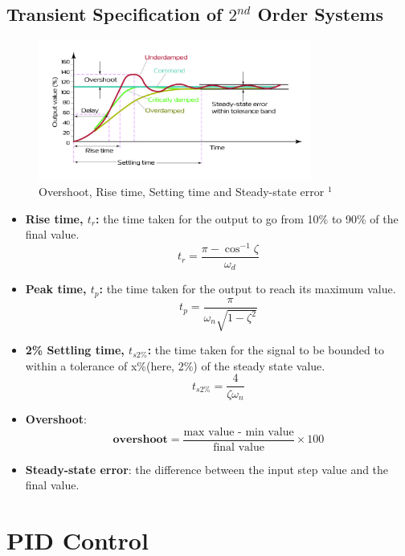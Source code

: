 \documentclass[12pt,a4paper]{article}
\begin{document}
\subsection{Transient Specification of $2^{nd}$ Order Systems}
\begin{figure}[H] \centering
\includegraphics[width=0.8\textwidth]{images/PID_response.jpg}
\caption{Overshoot, Rise time, Setting time and Steady-state error $^{1}$}
\end{figure}
\begin{itemize}
\item \textbf{Rise time, $t_{r}$:} the time taken for the output to go from 10\% to 90\% of the final value.
\[t_{r} = \frac{\pi-\cos^{-1}\zeta}{\omega_{d}}\]
\item \textbf{Peak time, $t_{p}$:} the time taken for the output to reach its maximum value.
\[t_{p} = \frac{\pi}{\omega_{n}\sqrt{1-\zeta^{2}}}\]
\item \textbf{2\% Settling time, $t_{s2\%}$:} the time taken for the signal to be bounded to within a tolerance of x\%(here, 2\%) of the steady state value.
\[t_{s2\%} = \frac{4}{\zeta\omega_{n}}\]
\item \textbf{Overshoot}: 
\[\textbf{overshoot} = \frac{\text{max value - min value}}{\text{final value}}\times 100\]
\item \textbf{Steady-state error}: the difference between the input step value and the final value.
\end{itemize}
\newpage
\section{PID Control}
\end{document}

